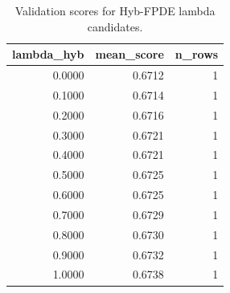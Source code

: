 \begin{table}[t]
\caption{Validation scores for Hyb-FPDE lambda candidates.}
\label{tab:lambda_distribution_computed}
\centering
\begin{tabular}{rrr}
\toprule
lambda\_hyb & mean\_score & n\_rows \\
\midrule
0.0000 & 0.6712 & 1 \\
0.1000 & 0.6714 & 1 \\
0.2000 & 0.6716 & 1 \\
0.3000 & 0.6721 & 1 \\
0.4000 & 0.6721 & 1 \\
0.5000 & 0.6725 & 1 \\
0.6000 & 0.6725 & 1 \\
0.7000 & 0.6729 & 1 \\
0.8000 & 0.6730 & 1 \\
0.9000 & 0.6732 & 1 \\
1.0000 & 0.6738 & 1 \\
\bottomrule
\end{tabular}

\end{table}
